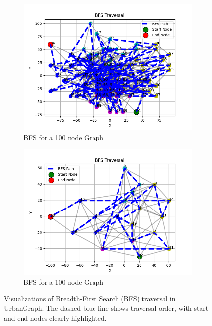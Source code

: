 \documentclass[12pt]{article}
\begin{document}
\begin{figure}[H]
    \centering
    \begin{subfigure}[b]{0.48\textwidth}
        \includegraphics[width=\textwidth]{../Images/sampleBFS_1.png}
        \caption{BFS for a 100 node Graph}
        \label{fig:bfs-1}
    \end{subfigure}
    \hfill
    \begin{subfigure}[b]{0.48\textwidth}
        \includegraphics[width=\textwidth]{../Images/sampleBFS_2.png}
        \caption{BFS for a 100 node Graph}
        \label{fig:bfs-2}
    \end{subfigure}
    \caption{Visualizations of Breadth-First Search (BFS) traversal in UrbanGraph. The dashed blue line shows traversal order, with start and end nodes clearly highlighted.}
    \label{fig:bfs-both}
\end{figure}
\end{document}
